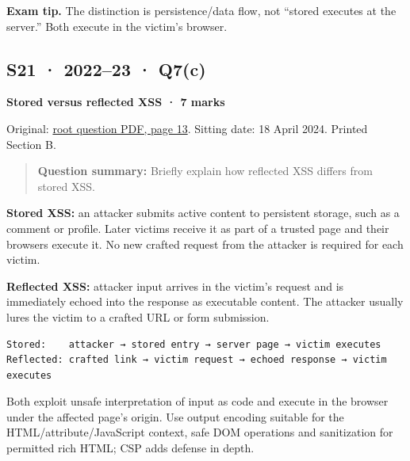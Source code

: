 \documentclass[11pt,a4paper]{article}
\begin{document}
{\color{ForestGreen}\textbf{Exam tip.} The distinction is persistence/\allowbreak{}data flow,\allowbreak{} not “stored executes at the server.” Both execute in the victim’s browser.}




\clearpage
\subsection{S21 · 2022–23 · Q7(c)}\label{s21}

\textbf{Stored versus reflected XSS · 7 marks}


Original: \href{../../CSE405-Security_Merged.pdf\#page=13}{root question PDF,\allowbreak{} page 13}. Sitting date: 18 April 2024. Printed Section B.



\begin{quote}\small

\textbf{Question summary:} Briefly explain how reflected XSS differs from stored XSS.



\end{quote}

\textbf{Stored XSS:} an attacker submits active content to persistent storage,\allowbreak{} such as a comment or profile. Later victims receive it as part of a trusted page and their browsers execute it. No new crafted request from the attacker is required for each victim.


\textbf{Reflected XSS:} attacker input arrives in the victim’s request and is immediately echoed into the response as executable content. The attacker usually lures the victim to a crafted URL or form submission.



\begin{Verbatim}[breaklines=true,breakanywhere=true,fontsize=\small,frame=single,rulecolor=\color{PanelBorder}]
Stored:    attacker → stored entry → server page → victim executes
Reflected: crafted link → victim request → echoed response → victim executes
\end{Verbatim}

Both exploit unsafe interpretation of input as code and execute in the browser under the affected page’s origin. Use output encoding suitable for the HTML/\allowbreak{}attribute/\allowbreak{}JavaScript context,\allowbreak{} safe DOM operations and sanitization for permitted rich HTML; CSP adds defense in depth.
\end{document}
